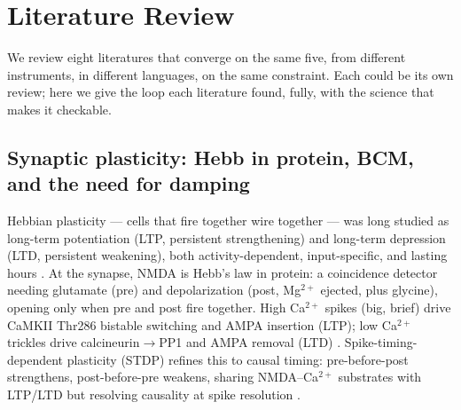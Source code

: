 \documentclass[11pt]{article}
\begin{document}
\section{Literature Review}
\label{sec:lit-review}

We review eight literatures that converge on the same five, from different instruments, in different languages, on the same constraint. Each could be its own review; here we give the loop each literature found, fully, with the science that makes it checkable.

\subsection{Synaptic plasticity: Hebb in protein, BCM, and the need for damping}

Hebbian plasticity --- cells that fire together wire together --- was long studied as long-term potentiation (LTP, persistent strengthening) and long-term depression (LTD, persistent weakening), both activity-dependent, input-specific, and lasting hours \citep{tononi2014}. At the synapse, NMDA is Hebb's law in protein: a coincidence detector needing glutamate (pre) and depolarization (post, Mg$^{2+}$ ejected, plus glycine), opening only when pre and post fire together. High Ca$^{2+}$ spikes (big, brief) drive CaMKII Thr286 bistable switching and AMPA insertion (LTP); low Ca$^{2+}$ trickles drive calcineurin$\to$PP1 and AMPA removal (LTD) \citep{tononi2014}. Spike-timing-dependent plasticity (STDP) refines this to causal timing: pre-before-post strengthens, post-before-pre weakens, sharing NMDA--Ca$^{2+}$ substrates with LTP/LTD but resolving causality at spike resolution \citep{tononi2014}.
\end{document}
